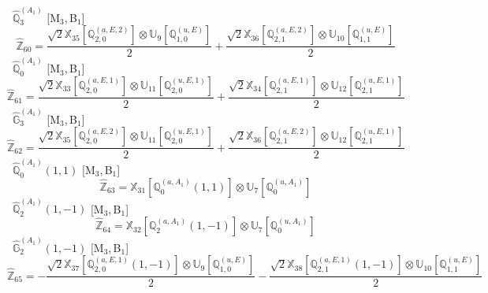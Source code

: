 \documentclass[fleqn,10pt,landscape]{article}
\begin{document}
\begin{itemize}
\begin{dmath*}
\end{dmath*}
\vspace{4mm}
\noindent {} $\,\,\,\hat{\mathbb{Q}}_{3}^{(A_{1})}$ [M$_{3}$,\,B$_{1}$]
\begin{dmath*}
\hat{\mathbb{Z}}_{60}=\frac{\sqrt{2} \mathbb{X}_{35}[\mathbb{Q}_{2,0}^{(a,E,2)}] \otimes\mathbb{U}_{9}[\mathbb{Q}_{1,0}^{(u,E)}]}{2} + \frac{\sqrt{2} \mathbb{X}_{36}[\mathbb{Q}_{2,1}^{(a,E,2)}] \otimes\mathbb{U}_{10}[\mathbb{Q}_{1,1}^{(u,E)}]}{2}
\end{dmath*}
\vspace{4mm}
\noindent {} $\,\,\,\hat{\mathbb{Q}}_{0}^{(A_{1})}$ [M$_{3}$,\,B$_{1}$]
\begin{dmath*}
\hat{\mathbb{Z}}_{61}=\frac{\sqrt{2} \mathbb{X}_{33}[\mathbb{Q}_{2,0}^{(a,E,1)}] \otimes\mathbb{U}_{11}[\mathbb{Q}_{2,0}^{(u,E,1)}]}{2} + \frac{\sqrt{2} \mathbb{X}_{34}[\mathbb{Q}_{2,1}^{(a,E,1)}] \otimes\mathbb{U}_{12}[\mathbb{Q}_{2,1}^{(u,E,1)}]}{2}
\end{dmath*}
\vspace{4mm}
\noindent {} $\,\,\,\hat{\mathbb{G}}_{3}^{(A_{1})}$ [M$_{3}$,\,B$_{1}$]
\begin{dmath*}
\hat{\mathbb{Z}}_{62}=\frac{\sqrt{2} \mathbb{X}_{35}[\mathbb{Q}_{2,0}^{(a,E,2)}] \otimes\mathbb{U}_{11}[\mathbb{Q}_{2,0}^{(u,E,1)}]}{2} + \frac{\sqrt{2} \mathbb{X}_{36}[\mathbb{Q}_{2,1}^{(a,E,2)}] \otimes\mathbb{U}_{12}[\mathbb{Q}_{2,1}^{(u,E,1)}]}{2}
\end{dmath*}
\vspace{4mm}
\noindent {} $\,\,\,\hat{\mathbb{Q}}_{0}^{(A_{1})}(1,1)$ [M$_{3}$,\,B$_{1}$]
\begin{dmath*}
\hat{\mathbb{Z}}_{63}=\mathbb{X}_{31}[\mathbb{Q}_{0}^{(a,A_{1})}(1,1)] \otimes\mathbb{U}_{7}[\mathbb{Q}_{0}^{(u,A_{1})}]
\end{dmath*}
\vspace{4mm}
\noindent {} $\,\,\,\hat{\mathbb{Q}}_{2}^{(A_{1})}(1,-1)$ [M$_{3}$,\,B$_{1}$]
\begin{dmath*}
\hat{\mathbb{Z}}_{64}=\mathbb{X}_{32}[\mathbb{Q}_{2}^{(a,A_{1})}(1,-1)] \otimes\mathbb{U}_{7}[\mathbb{Q}_{0}^{(u,A_{1})}]
\end{dmath*}
\vspace{4mm}
\noindent {} $\,\,\,\hat{\mathbb{G}}_{2}^{(A_{1})}(1,-1)$ [M$_{3}$,\,B$_{1}$]
\begin{dmath*}
\hat{\mathbb{Z}}_{65}=- \frac{\sqrt{2} \mathbb{X}_{37}[\mathbb{Q}_{2,0}^{(a,E,1)}(1,-1)] \otimes\mathbb{U}_{9}[\mathbb{Q}_{1,0}^{(u,E)}]}{2} - \frac{\sqrt{2} \mathbb{X}_{38}[\mathbb{Q}_{2,1}^{(a,E,1)}(1,-1)] \otimes\mathbb{U}_{10}[\mathbb{Q}_{1,1}^{(u,E)}]}{2}

\end{dmath*}
\end{itemize}
\end{document}
